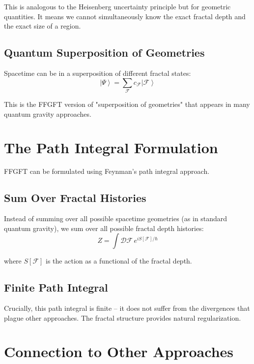 	This is analogous to the Heisenberg uncertainty principle but for geometric quantities. It means we cannot simultaneously know the exact fractal depth and the exact size of a region.
	
	\subsection{Quantum Superposition of Geometries}
	
	Spacetime can be in a superposition of different fractal states:
	\begin{equation}
		\left|\Psi\right\rangle = \sum_{\mathcal{F}} c_{\mathcal{F}} \left|\mathcal{F}\right\rangle
	\end{equation}
	
	This is the FFGFT version of "superposition of geometries" that appears in many quantum gravity approaches.
	
	\section{The Path Integral Formulation}
	
	FFGFT can be formulated using Feynman's path integral approach.
	
	\subsection{Sum Over Fractal Histories}
	
	Instead of summing over all possible spacetime geometries (as in standard quantum gravity), we sum over all possible fractal depth histories:
	\begin{equation}
		Z = \int \mathcal{D}\mathcal{F} \, e^{iS[\mathcal{F}]/\hbar}
	\end{equation}
	
	where $S[\mathcal{F}]$ is the action as a functional of the fractal depth.
	
	\subsection{Finite Path Integral}
	
	Crucially, this path integral is finite -- it does not suffer from the divergences that plague other approaches. The fractal structure provides natural regularization.
	
	\section{Connection to Other Approaches}
	
